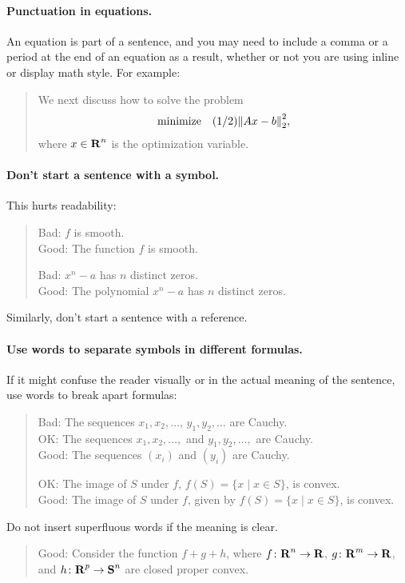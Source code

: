 \documentclass{article}
\begin{document}
\paragraph{Punctuation in equations.}
An equation is part of a sentence, and you may need to include a comma or a period at the end of an equation as a result, whether or not you are using inline or display math style. 
For example:
\begin{quote}
    We next discuss how to solve the problem
    \[
        \begin{array}{ll}
            \mbox{minimize} & (1/2){\lVert Ax - b \rVert}_2^2,
        \end{array}
    \]
    where $x \in {\bf R{}}^n$ is the optimization variable.
\end{quote}

\paragraph{Don't start a sentence with a symbol.}
This hurts readability:
\begin{quote}
    Bad: $f$ is smooth.\\
    Good: The function $f$ is smooth.

    Bad: $x^n - a$ has $n$ distinct zeros. \\
    Good: The polynomial $x^n - a$ has $n$ distinct zeros.
\end{quote}
Similarly, don't start a sentence with a reference.

\paragraph{Use words to separate symbols in different formulas.}
If it might confuse the reader visually or in the actual meaning of the sentence, use words to break apart formulas:
\begin{quote}
    Bad: The sequences $x_1, x_2, \dots$, $y_1, y_2, \dots$ are Cauchy. \\
    OK: The sequences $x_1, x_2, \dots,$ and $y_1, y_2, \dots,$ are Cauchy. \\
    Good: The sequences $(x_i)$ and $(y_i)$ are Cauchy.

    OK: The image of $S$ under $f$, $f(S) = \{ x \mid x \in S \}$, is convex. \\
    Good: The image of $S$ under $f$, given by $f(S) = \{ x \mid x \in S \}$, is convex.
\end{quote}
Do not insert superfluous words if the meaning is clear.
\begin{quote}
    Good: Consider the function $f + g + h$, where $f \colon {\bf R{}}^n \to {\bf R{}}$, $g \colon {\bf R{}}^m \to {\bf R{}}$, and $h \colon {\bf R{}}^p \to {\bf S{}}^n$ are closed proper convex.
\end{quote}
\end{document}
